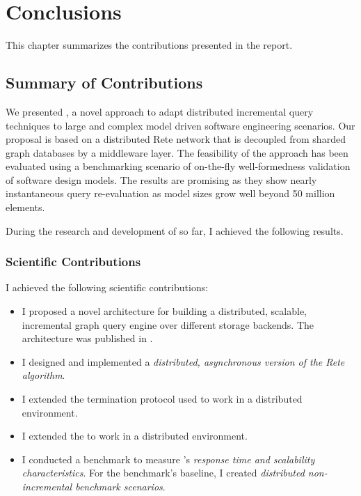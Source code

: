 \chapter{Conclusions}
\label{chap:conclusions}

This chapter summarizes the contributions presented in the report. 

\section{Summary of Contributions}
\label{summary}

We presented \iqd{}, a novel approach to adapt distributed incremental query techniques to large and complex model driven software engineering scenarios. Our proposal is based on a distributed Rete network that is decoupled from sharded graph databases by a middleware layer. The feasibility of the approach has been evaluated using a benchmarking scenario of on-the-fly well-formedness validation of software design models. The results are promising as they show nearly instantaneous query re-evaluation as model sizes grow well beyond 50 million elements.

During the research and development of \iqd{} so far, I achieved the following results.

\subsection{Scientific Contributions}

I achieved the following scientific contributions:

\begin{itemize}
  \item I proposed a novel architecture for building a distributed, scalable, incremental graph query engine over different storage backends. The architecture was published in \cite{Izso:2013:IIG:2487766.2487772}. 
  \item I designed and implemented a \emph{distributed, asynchronous version of the Rete algorithm}. 
  \item I extended the termination protocol used \eiq{} to work in a distributed environment. 
  \item I extended the \tb{} to work in a distributed environment.  
  \item I conducted a benchmark to measure \iqd{}'s \emph{response time and scalability characteristics}. For the benchmark's baseline, I created \emph{distributed non-incremental benchmark scenarios}. 
\end{itemize}

